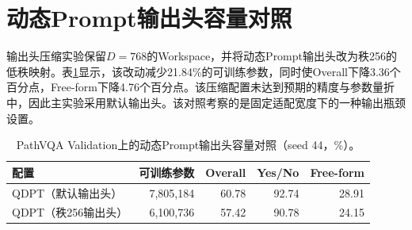 \section{动态Prompt输出头容量对照}
\label{sec:output-head-appendix}

输出头压缩实验保留$D=768$的Workspace，并将动态Prompt输出头改为秩256的低秩映射。表\ref{tab:output-head}显示，该改动减少21.84\%的可训练参数，同时使Overall下降3.36个百分点，Free-form下降4.76个百分点。该压缩配置未达到预期的精度与参数量折中，因此主实验采用默认输出头。该对照考察的是固定适配宽度下的一种输出瓶颈设置。

\begin{table}[t]
    \centering
    \caption{PathVQA Validation上的动态Prompt输出头容量对照（seed 44，\%）。}
    \label{tab:output-head}
    \small
    \begin{tabular}{@{}lrrrr@{}}
        \toprule
        配置 & 可训练参数 & Overall & Yes/No & Free-form \\
        \midrule
        QDPT（默认输出头） & 7,805,184 & 60.78 & 92.74 & 28.91 \\
        QDPT（秩256输出头） & 6,100,736 & 57.42 & 90.78 & 24.15 \\
        \bottomrule
    \end{tabular}
\end{table}
